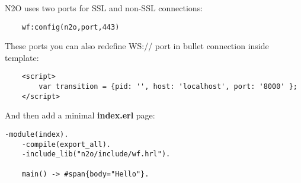 N2O uses two ports for SSL and non-SSL connections: 

\begin{lstlisting}
    wf:config(n2o,port,443)
\end{lstlisting}

These ports you can also redefine WS:// port in bullet connection inside template:

\begin{lstlisting}
    <script>
        var transition = {pid: '', host: 'localhost', port: '8000' };
    </script>
\end{lstlisting}

And then add a minimal {\bf index.erl} page:

\begin{lstlisting}[caption=index.erl]
    -module(index).
    -compile(export_all).
    -include_lib("n2o/include/wf.hrl").

    main() -> #span{body="Hello"}.
\end{lstlisting}
